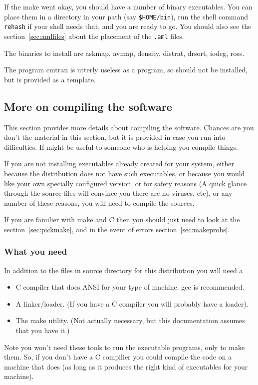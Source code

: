 \documentclass[%
	11pt,
        a4paper,
        twoside]{workrep}
\newcommand*{\prg}[1]{\textsf{#1}}		%
\newcommand*{\cmd}[1]{\texttt{#1}}		%
\newcommand*{\file}[1]{\texttt{#1}}		%
\begin{document}
If the make went okay, you should have a number of binary executables.
You can place them in a directory in your path (say \file{\$HOME/bin}), run
the shell command \cmd{rehash} if your shell needs that, and you are ready
to go.  You should also see the section~\ref{sec:amlfiles} about the
placement of the \file{.aml} files.

The binaries to install are
 \prg{askmap},
 \prg{avmap},
 \prg{density},
 \prg{distrat},
 \prg{drsort},
 \prg{iodeg},
 \prg{ross}.

The program \prg{cmtran} is utterly useless as a program, so should
not be installed, but is provided as a template.

\subsection{More on compiling the software}\label{sec:make}

This section provides more details about compiling the software.
Chances are you don't the material in this section, but it is
provided in case you run into difficulties.  If might be useful
to someone who is helping you compile things.

If you are not installing executables already created for your system,
either because the distribution does not have such executables, or
because you would like your own specially configured version, or
for safety reasons (A quick glance through the source files will
convince you there are no viruses, etc), or any number of these reasons,
you will need to compile the sources.

If you are familier with \prg{make} and \prg{C} then you should just
need to look at the section~\ref{sec:pickmake}, and in the event of
errors section~\ref{sec:makeprobs}.

\subsubsection{What you need}

In addition to the files in source directory for this distribution you
will need a
\begin{itemize}
\item
    C compiler that does ANSI for your type of machine.  gcc is
    recommended.

\item
    A linker/loader.  (If you have a C compiler you will probably
    have a loader).

\item
    The \prg{make} utility.  (Not actually necessary, but this documentation
         assumes that you have it.)
\end{itemize}
Note you won't need these tools to run the executable programs,
only to make them.  So, if you don't have a C compilier you could
compile the code on a machine that does (as long as it produces the
right kind of executables for your machine).
\end{document}
